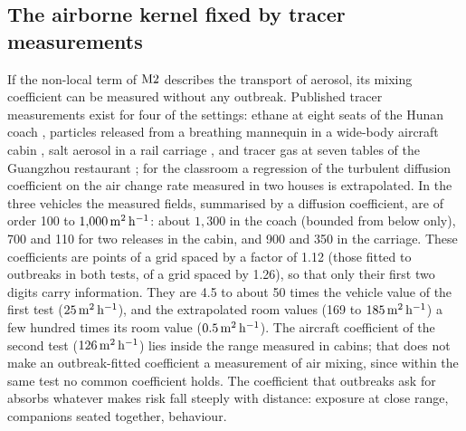 \subsection{The airborne kernel fixed by tracer measurements}\label{s8b_evidence:sec:tracer}

If the non-local term of $\mathrm{M2}$ describes the transport of aerosol, its mixing coefficient can be measured
without any outbreak. Published tracer measurements exist for four of the settings: ethane at eight seats of the
Hunan coach \citep{ou2022}, particles released from a breathing mannequin in a wide-body aircraft cabin
\citep{kinahan2021aerosol}, salt aerosol in a rail carriage \citep{woodward2022evaluation}, and tracer gas at
seven tables of the Guangzhou restaurant \citep{li2021}; for the classroom a regression of the turbulent diffusion
coefficient on the air change rate measured in two houses \citep{cheng2011modeling} is extrapolated. In the three
vehicles the measured fields, summarised by a diffusion coefficient, are of order 100 to $1{,}000\,\mathrm{m}^2\,\mathrm{h}^{-1}$: about
$1{,}300$ in the coach (bounded from below only), 700 and 110 for two releases in the cabin, and 900 and 350 in
the carriage. These coefficients are points of a grid spaced by a factor of 1.12 (those fitted to outbreaks in
both tests, of a grid spaced by 1.26), so that only their first two digits carry information. They are 4.5 to about 50 times the
vehicle value of the first test ($25\,\mathrm{m}^2\,\mathrm{h}^{-1}$), and the extrapolated room values (169 to $185\,\mathrm{m}^2\,\mathrm{h}^{-1}$) a few hundred
times its room value ($0.5\,\mathrm{m}^2\,\mathrm{h}^{-1}$). The aircraft coefficient of the second test
($126\,\mathrm{m}^2\,\mathrm{h}^{-1}$) lies inside the range measured in cabins; that does not make an outbreak-fitted coefficient a
measurement of air mixing, since within the same test no common coefficient holds. The coefficient that
outbreaks ask for absorbs whatever makes risk fall steeply with distance: exposure at close range, companions
seated together, behaviour.

